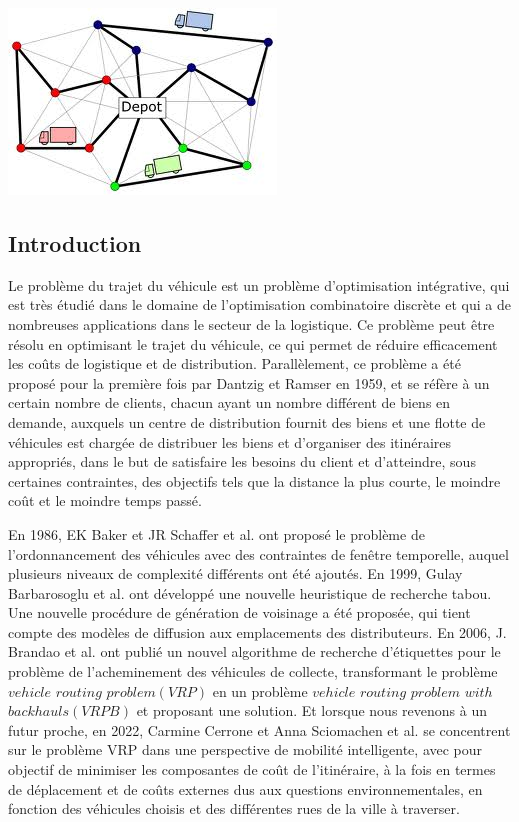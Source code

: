 \documentclass[12pt]{article}
\begin{document}
    \vspace{3cm}
	\begin{center}
	    \includegraphics[scale=1]{Photos/vrp.jpg}
	\end{center}
    \thispagestyle{empty}
    \newpage
    \begin{center}
    \section*{Introduction}    
    \end{center}
    \par
    Le problème du trajet du véhicule est un problème d'optimisation intégrative, qui est très étudié dans le domaine de l'optimisation combinatoire discrète et qui a de nombreuses applications dans le secteur de la logistique. Ce problème peut être résolu en optimisant le trajet du véhicule, ce qui permet de réduire efficacement les coûts de logistique et de distribution. Parallèlement, ce problème a été proposé pour la première fois par Dantzig et Ramser en 1959, et se réfère à un certain nombre de clients, chacun ayant un nombre différent de biens en demande, auxquels un centre de distribution fournit des biens et une flotte de véhicules est chargée de distribuer les biens et d'organiser des itinéraires appropriés, dans le but de satisfaire les besoins du client et d'atteindre, sous certaines contraintes, des objectifs tels que la distance la plus courte, le moindre coût et le moindre temps passé.
    \par
    En 1986, EK Baker et JR Schaffer et al. ont proposé le problème de l'ordonnancement des véhicules avec des contraintes de fenêtre temporelle\cite{baker1986solution}, auquel plusieurs niveaux de complexité différents ont été ajoutés. En 1999, Gulay Barbarosoglu et al. ont développé une nouvelle heuristique de recherche tabou\cite{barbarosoglu1999tabu}. Une nouvelle procédure de génération de voisinage a été proposée, qui tient compte des modèles de diffusion aux emplacements des distributeurs. En 2006, J. Brandao et al. ont publié un nouvel algorithme de recherche d'étiquettes pour le problème de l'acheminement des véhicules de collecte\cite{brandao2006new}, transformant le problème $vehicle$ $routing$ $problem(VRP)$ en un problème $vehicle$ $routing$ $problem$ $with$ $backhauls(VRPB)$ et proposant une solution. Et lorsque nous revenons à un futur proche, en 2022, Carmine Cerrone et Anna Sciomachen et al. se concentrent sur le problème VRP dans une perspective de mobilité intelligente, avec pour objectif de minimiser les composantes de coût de l'itinéraire\cite{cerrone2022vrp}, à la fois en termes de déplacement et de coûts externes dus aux questions environnementales, en fonction des véhicules choisis et des différentes rues de la ville à traverser.
\end{document}
